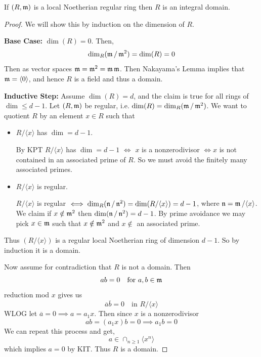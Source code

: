 \documentclass[12pt]{amsart}
\begin{document}
\begin{lemma}
    If $(R, \operatorname{\mathfrak{m}})$ is a local Noetherian regular ring then $R$ is an integral domain. 
\end{lemma}


\begin{proof}
    We will show this by induction on the dimension of $R$. 

    \textbf{Base Case:} $\dim(R) = 0$. Then, 
    \[\dim_R(\operatorname{\mathfrak{m}}/\operatorname{\mathfrak{m}}^2) = \dim(R) = 0\]
    Then as vector spaces $\operatorname{\mathfrak{m}} = \operatorname{\mathfrak{m}}^2 = \operatorname{\mathfrak{m}} \operatorname{\mathfrak{m}} $. Then Nakayama's Lemma implies that $\operatorname{\mathfrak{m}} = \langle 0 \rangle$, and hence $R$ is a field and thus a domain.
    
    \textbf{Inductive Step:} Assume $\dim(R) = d$, and the claim is true for all rings of $\dim \leq d-1$. Let $(R, \operatorname{\mathfrak{m}})$ be regular, i.e. $\dim(R) = \dim_R(\operatorname{\mathfrak{m}}/\operatorname{\mathfrak{m}}^2)$. We want to quotient $R$ by an element $x \in R$ such that 
    \begin{itemize}
        \item $R/\langle x \rangle$ has $\dim = d - 1$. 
        
        By KPT $R/\langle x \rangle$ has $\dim = d-1$ $\iff$ $x$ is a nonzerodivisor $\iff x$ is not contained in an associated prime of $R$. So we must avoid the finitely many associated primes. 

        \item $R/\langle x \rangle$ is regular.
        
        $R/\langle x \rangle$ is regular $\iff \dim_R(\operatorname{\mathfrak{n}}/\operatorname{\mathfrak{n}}^2) = \dim(R/\langle x \rangle) = d - 1$, where $\operatorname{\mathfrak{n}} = \operatorname{\mathfrak{m}} / \langle x \rangle$. We claim if $x \notin \operatorname{\mathfrak{m}}^2$ then $\dim(\operatorname{\mathfrak{n}}/\operatorname{\mathfrak{n}}^2) = d -1$. By prime avoidance we may pick $x \in \operatorname{\mathfrak{m}}$ such that $x \notin \operatorname{\mathfrak{m}}^2$ and $x \notin$ an associated prime.   
    \end{itemize}

    Thus $(R/\langle x \rangle)$ is a regular local Noetherian ring of dimension $d - 1$. So by induction it is a domain. 

    Now assume for contradiction that $R$ is not a domain. Then
    \[ab = 0 \quad \text{for } a, b \in \operatorname{\mathfrak{m}} \]
    reduction mod $x$ gives us
    \[\overline{a}\overline{b} = 0 \quad \text{in } R/\langle x \rangle\]
    WLOG let $\overline{a} = 0 \implies a = a_1 x$. Then since $x$ is a nonzerodivisor
    \[ab = (a_1x) b = 0 \implies a_1b = 0\] 
    We can repeat this process and get, 
    \[a \in \cap_{n \geq 1} \langle x^n \rangle\]
    which implies $a = 0$ by KIT. Thus $R$ is a domain. 
\end{proof}
\end{document}
